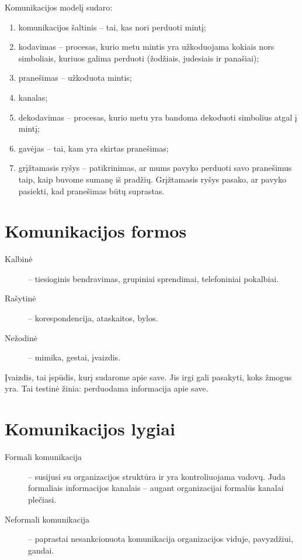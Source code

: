 Komunikacijos modelį sudaro:
\begin{enumerate}
  \item komunikacijos šaltinis – tai, kas nori perduoti mintį;
  \item kodavimas – procesas, kurio metu mintis yra užkoduojama
    kokiais nors simboliais, kuriuos galima perduoti (žodžiais,
    judesiais ir panašiai);
  \item pranešimas – užkoduota mintis;
  \item kanalas;
  \item dekodavimas – procesas, kurio metu yra bandoma dekoduoti
    simbolius atgal į mintį;
  \item gavėjas – tai, kam yra skirtas pranešimas;
  \item grįžtamasis ryšys – patikrinimas, ar mums pavyko perduoti
    savo pranešimus taip, kaip buvome sumanę iš pradžių. Grįžtamasis
    ryšys pasako, ar pavyko pasiekti, kad pranešimas būtų suprastas.
\end{enumerate}

\section{Komunikacijos formos}

\begin{description}
  \item[Kalbinė] – tiesioginis bendravimas, grupiniai sprendimai,
    telefoniniai pokalbiai.
  \item[Rašytinė] – korespondencija, ataskaitos, bylos.
  \item[Nežodinė] – mimika, gestai, įvaizdis.
\end{description}

Įvaizdis, tai įspūdis, kurį sudarome apie save. Jis irgi gali pasakyti,
koks žmogus yra. Tai testinė žinia: perduodama informacija apie save.

\section{Komunikacijos lygiai}

\begin{description}
  \item[Formali komunikacija] – susijusi su organizacijos struktūra ir
    yra kontroliuojama vadovų. Juda formaliais informacijos kanalais
    – augant organizacijai formalūs kanalai plečiasi.
  \item[Neformali komunikacija] – paprastai nesankcionuota komunikacija
    organizacijos viduje, pavyzdžiui, gandai.
\end{description}

